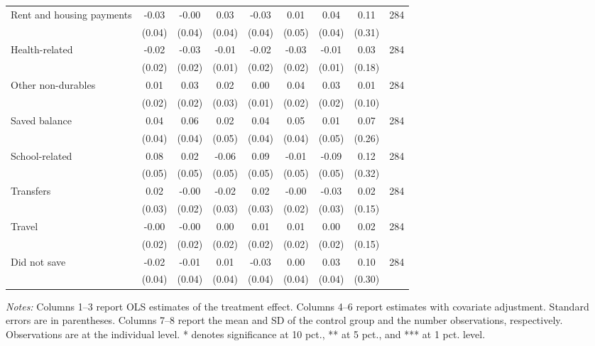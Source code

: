 \begin{table}[h]
{\begin{threeparttable}
\begin{tabular}{l*{8}{c}}
Rent and housing payments&    -0.03&    -0.00&     0.03&    -0.03&     0.01&     0.04&     0.11&      284\\
          &   (0.04)&   (0.04)&   (0.04)&   (0.04)&   (0.05)&   (0.04)&   (0.31)&         \\
Health-related&    -0.02&-0.03\sym{*}&    -0.01&    -0.02&-0.03\sym{*}&    -0.01&     0.03&      284\\
          &   (0.02)&   (0.02)&   (0.01)&   (0.02)&   (0.02)&   (0.01)&   (0.18)&         \\
Other non-durables&     0.01&     0.03&     0.02&     0.00&     0.04&     0.03&     0.01&      284\\
          &   (0.02)&   (0.02)&   (0.03)&   (0.01)&   (0.02)&   (0.02)&   (0.10)&         \\
Saved balance&     0.04&     0.06&     0.02&     0.04&     0.05&     0.01&     0.07&      284\\
          &   (0.04)&   (0.04)&   (0.05)&   (0.04)&   (0.04)&   (0.05)&   (0.26)&         \\
School-related&     0.08&     0.02&    -0.06&0.09\sym{*}&    -0.01&-0.09\sym{*}&     0.12&      284\\
          &   (0.05)&   (0.05)&   (0.05)&   (0.05)&   (0.05)&   (0.05)&   (0.32)&         \\
Transfers &     0.02&    -0.00&    -0.02&     0.02&    -0.00&    -0.03&     0.02&      284\\
          &   (0.03)&   (0.02)&   (0.03)&   (0.03)&   (0.02)&   (0.03)&   (0.15)&         \\
Travel    &    -0.00&    -0.00&     0.00&     0.01&     0.01&     0.00&     0.02&      284\\
          &   (0.02)&   (0.02)&   (0.02)&   (0.02)&   (0.02)&   (0.02)&   (0.15)&         \\
Did not save&    -0.02&    -0.01&     0.01&    -0.03&     0.00&     0.03&     0.10&      284\\
          &   (0.04)&   (0.04)&   (0.04)&   (0.04)&   (0.04)&   (0.04)&   (0.30)&         \\
\bottomrule \end{tabular} \begin{tablenotes}[flushleft] \footnotesize \item \emph{Notes:} Columns 1--3 report OLS estimates of the treatment effect. Columns 4--6 report estimates with covariate adjustment. Standard errors are in parentheses. Columns 7--8 report the mean and SD of the control group and the number observations, respectively. Observations are at the individual level. * denotes significance at 10 pct., ** at 5 pct., and *** at 1 pct. level. \end{tablenotes} \end{threeparttable} } \end{table}

